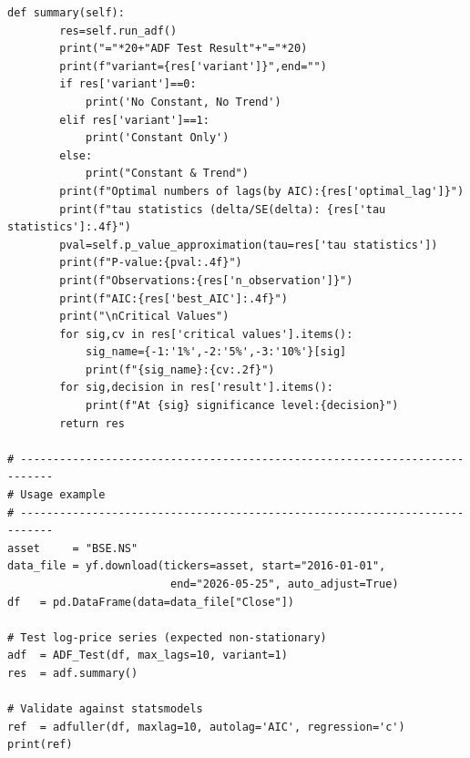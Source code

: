 \documentclass[10pt,a4paper,twocolumn]{article}
\begin{document}
\begin{lstlisting}[style=python,
  caption={ADF\_Test.py --- step-annotated implementation of the
  Augmented Dickey-Fuller test from first principles}]
    def summary(self):
        res=self.run_adf()
        print("="*20+"ADF Test Result"+"="*20)
        print(f"variant={res['variant']}",end="")
        if res['variant']==0:
            print('No Constant, No Trend')
        elif res['variant']==1:
            print('Constant Only')
        else:
            print("Constant & Trend")
        print(f"Optimal numbers of lags(by AIC):{res['optimal_lag']}")
        print(f"tau statistics (delta/SE(delta): {res['tau statistics']:.4f}")
        pval=self.p_value_approximation(tau=res['tau statistics'])
        print(f"P-value:{pval:.4f}")
        print(f"Observations:{res['n_observation']}")
        print(f"AIC:{res['best_AIC']:.4f}")
        print("\nCritical Values")
        for sig,cv in res['critical values'].items():
            sig_name={-1:'1%',-2:'5%',-3:'10%'}[sig]
            print(f"{sig_name}:{cv:.2f}")
        for sig,decision in res['result'].items():
            print(f"At {sig} significance level:{decision}")
        return res

# ---------------------------------------------------------------------------
# Usage example
# ---------------------------------------------------------------------------
asset     = "BSE.NS"
data_file = yf.download(tickers=asset, start="2016-01-01",
                         end="2026-05-25", auto_adjust=True)
df   = pd.DataFrame(data=data_file["Close"])

# Test log-price series (expected non-stationary)
adf  = ADF_Test(df, max_lags=10, variant=1)
res  = adf.summary()

# Validate against statsmodels
ref  = adfuller(df, maxlag=10, autolag='AIC', regression='c')
print(ref)
\end{lstlisting}
\end{document}

